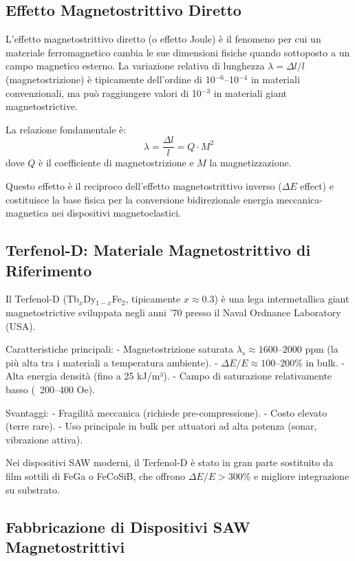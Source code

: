 \documentclass[11pt,a4paper]{article}
\begin{document}
\subsection{Effetto Magnetostrittivo Diretto}

L'effetto magnetostrittivo diretto (o effetto Joule) è il fenomeno per cui un materiale ferromagnetico cambia le sue dimensioni fisiche quando sottoposto a un campo magnetico esterno. La variazione relativa di lunghezza $\lambda = \Delta l / l$ (magnetostrizione) è tipicamente dell'ordine di 10$^{-6}$–10$^{-4}$ in materiali convenzionali, ma può raggiungere valori di 10$^{-3}$ in materiali giant magnetostrictive.

La relazione fondamentale è:
\begin{equation}
\lambda = \frac{\Delta l}{l} = Q \cdot M^2
\end{equation}
dove $Q$ è il coefficiente di magnetostrizione e $M$ la magnetizzazione.

Questo effetto è il reciproco dell'effetto magnetostrittivo inverso ($\Delta E$ effect) e costituisce la base fisica per la conversione bidirezionale energia meccanica-magnetica nei dispositivi magnetoelastici.

\subsection{Terfenol-D: Materiale Magnetostrittivo di Riferimento}

Il Terfenol-D (Tb$_{x}$Dy$_{1-x}$Fe$_2$, tipicamente $x \approx 0.3$) è una lega intermetallica giant magnetostrictive sviluppata negli anni '70 presso il Naval Ordnance Laboratory (USA).

Caratteristiche principali:
- Magnetostrizione saturata $\lambda_s \approx 1600–2000$ ppm (la più alta tra i materiali a temperatura ambiente).
- $\Delta E/E \approx 100–200\%$ in bulk.
- Alta energia densità (fino a 25 kJ/m³).
- Campo di saturazione relativamente basso (~200–400 Oe).

Svantaggi:
- Fragilità meccanica (richiede pre-compressione).
- Costo elevato (terre rare).
- Uso principale in bulk per attuatori ad alta potenza (sonar, vibrazione attiva).

Nei dispositivi SAW moderni, il Terfenol-D è stato in gran parte sostituito da film sottili di FeGa o FeCoSiB, che offrono $\Delta E/E > 300\%$ e migliore integrazione su substrato.

\subsection{Fabbricazione di Dispositivi SAW Magnetostrittivi}
\end{document}
